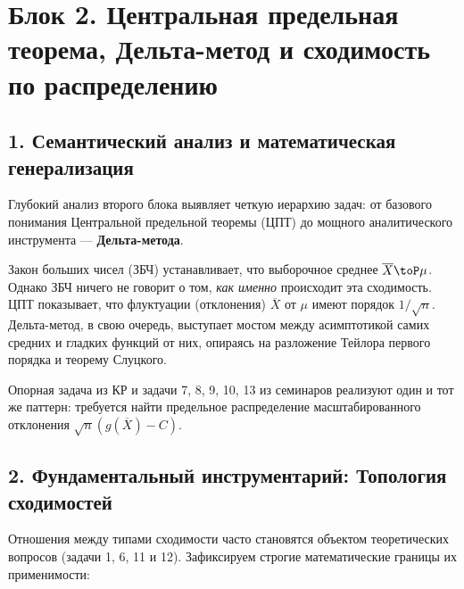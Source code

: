 \section*{Блок 2. Центральная предельная теорема, Дельта-метод и сходимость по распределению}

\subsection*{1. Семантический анализ и математическая генерализация}

Глубокий анализ второго блока выявляет четкую иерархию задач: от базового понимания Центральной предельной теоремы (ЦПТ) до мощного аналитического инструмента — \textbf{Дельта-метода}. 

Закон больших чисел (ЗБЧ) устанавливает, что выборочное среднее $\overline{X} \toP \mu$. Однако ЗБЧ ничего не говорит о том, \textit{как именно} происходит эта сходимость. ЦПТ показывает, что флуктуации (отклонения) $\overline{X}$ от $\mu$ имеют порядок $1/\sqrt{n}$. Дельта-метод, в свою очередь, выступает мостом между асимптотикой самих средних и гладких функций от них, опираясь на разложение Тейлора первого порядка и теорему Слуцкого.

Опорная задача из КР и задачи 7, 8, 9, 10, 13 из семинаров реализуют один и тот же паттерн: требуется найти предельное распределение масштабированного отклонения $\sqrt{n}(g(\overline{X}) - C)$.

\subsection*{2. Фундаментальный инструментарий: Топология сходимостей}

Отношения между типами сходимости часто становятся объектом теоретических вопросов (задачи 1, 6, 11 и 12). Зафиксируем строгие математические границы их применимости:

